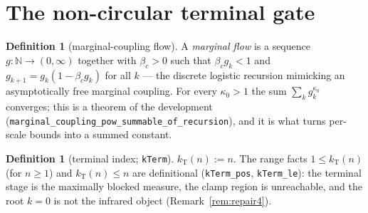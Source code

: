 \documentclass[11pt]{article}
\theoremstyle{definition}
\newtheorem{definition}[theorem]{Definition}
\newcommand{\lean}[1]{\texttt{#1}}
\newcommand{\kT}{k_{\mathrm{T}}}
\begin{document}
\section{The non-circular terminal gate}\label{sec:gate}

\begin{definition}[marginal-coupling flow]\label{def:flow}
A \emph{marginal flow} is a sequence $g : \mathbb{N} \to (0, \infty)$
together with $\beta_c > 0$ such that $\beta_c g_k < 1$ and
$g_{k+1} = g_k (1 - \beta_c g_k)$ for all $k$ --- the discrete
logistic recursion mimicking an asymptotically free marginal coupling.
For every $\kappa_0 > 1$ the sum $\sum_k g_k^{\kappa_0}$ converges;
this is a theorem of the development
(\lean{marginal\_coupling\_pow\_summable\_of\_recursion}), and it is
what turns per-scale bounds into a summed constant.
\end{definition}

\begin{definition}[terminal index; \lean{kTerm}]\label{def:kterm}
$\kT(n) := n$.  The range facts $1 \le \kT(n)$ (for $n \ge 1$) and
$\kT(n) \le n$ are definitional (\lean{kTerm\_pos}, \lean{kTerm\_le}):
the terminal stage is the maximally blocked measure, the clamp region
is unreachable, and the root $k = 0$ is not the infrared object
(Remark~\ref{rem:repair4}).
\end{definition}
\end{document}
